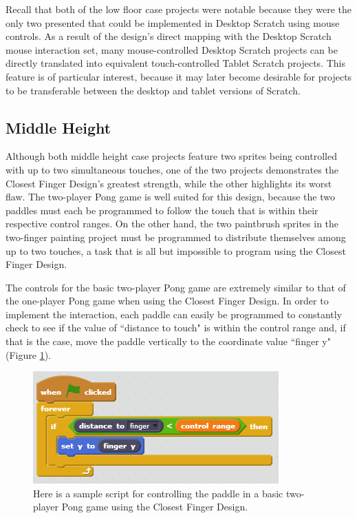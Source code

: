 Recall that both of the low floor case projects were notable because they were the only two presented that could be implemented in Desktop Scratch using mouse controls. As a result of the design's direct mapping with the Desktop Scratch mouse interaction set, many mouse-controlled Desktop Scratch projects can be directly translated into equivalent touch-controlled Tablet Scratch projects. This feature is of particular interest, because it may later become desirable for projects to be transferable between the desktop and tablet versions of Scratch.

\subsection{Middle Height}

Although both middle height case projects feature two sprites being controlled with up to two simultaneous touches, one of the two projects demonstrates the Closest Finger Design's greatest strength, while the other highlights its worst flaw. The two-player Pong game is well suited for this design, because the two paddles must each be programmed to follow the touch that is within their respective control ranges. On the other hand, the two paintbrush sprites in the two-finger painting project must be programmed to distribute themselves among up to two touches, a task that is all but impossible to program using the Closest Finger Design.

The controls for the basic two-player Pong game are extremely similar to that of the one-player Pong game when using the Closest Finger Design. In order to implement the interaction, each paddle can easily be programmed to constantly check to see if the value of ``distance to touch" is within the control range and, if that is the case, move the paddle vertically to the coordinate value ``finger y" (Figure \ref{BasicTwoPlayerPongCFD}). 

\begin{figure}
\centering
\includegraphics{images/BasicTwoPlayerPongCFD.PNG}
\caption[Sample Closest Finger Design Script for Basic Two-Player Pong]{Here is a sample script for controlling the paddle in a basic two-player Pong game using the Closest Finger Design.}
\label{BasicTwoPlayerPongCFD}
\end{figure}

